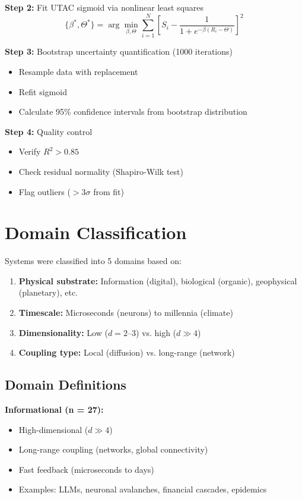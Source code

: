 \documentclass[11pt,a4paper]{article}
\begin{document}
\textbf{Step 2:} Fit UTAC sigmoid via nonlinear least squares
\begin{equation}
\{\beta^*, \Theta^*\} = \arg\min_{\beta, \Theta} \sum_{i=1}^N \left[S_i - \frac{1}{1 + e^{-\beta(R_i - \Theta)}}\right]^2
\end{equation}

\textbf{Step 3:} Bootstrap uncertainty quantification (1000 iterations)
\begin{itemize}
\item Resample data with replacement
\item Refit sigmoid
\item Calculate 95\% confidence intervals from bootstrap distribution
\end{itemize}

\textbf{Step 4:} Quality control
\begin{itemize}
\item Verify $R^2 > 0.85$
\item Check residual normality (Shapiro-Wilk test)
\item Flag outliers ($> 3\sigma$ from fit)
\end{itemize}

\section{Domain Classification}

Systems were classified into 5 domains based on:

\begin{enumerate}
\item \textbf{Physical substrate:} Information (digital), biological (organic), geophysical (planetary), etc.
\item \textbf{Timescale:} Microseconds (neurons) to millennia (climate)
\item \textbf{Dimensionality:} Low ($d = 2$--3) vs. high ($d \gg 4$)
\item \textbf{Coupling type:} Local (diffusion) vs. long-range (network)
\end{enumerate}

\subsection{Domain Definitions}

\textbf{Informational (n = 27):}
\begin{itemize}
\item High-dimensional ($d \gg 4$)
\item Long-range coupling (networks, global connectivity)
\item Fast feedback (microseconds to days)
\item Examples: LLMs, neuronal avalanches, financial cascades, epidemics
\end{itemize}
\end{document}
